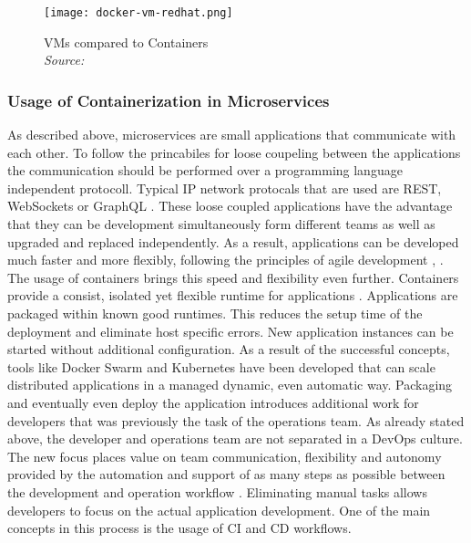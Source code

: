\documentclass[12pt, a4paper]{article}
\begin{document}
        \begin{figure}
            \centering
            \texttt{[image: docker-vm-redhat.png]}
            \caption{\ac{VM}s compared to Containers \\\textit{Source:~\cite{redhat_pic}}}\label{fig::vm_docker}
        \end{figure}

        \subsubsection{Usage of Containerization in Microservices}
        As described above, microservices are small applications that communicate with each other. To follow the princabiles for loose coupeling between the applications the communication should be performed over a programming language independent protocoll. Typical \acs{IP} network protocals that are used are \ac{REST}, WebSockets or GraphQL \cite{micro}. These loose coupled applications have the advantage that they can be development simultaneously form different teams as well as upgraded and replaced independently. As a result, applications can be developed much faster and more flexibly, following the principles of agile development \cite{micro}, \cite{redhat_micro}.\newline
        The usage of containers brings this speed and flexibility even further. Containers provide a consist, isolated yet flexible runtime for applications \cite{micro_container}. Applications are packaged within known good runtimes. This reduces the setup time of the deployment and eliminate host specific errors. New application instances can be started without additional configuration. As a result of the successful concepts, tools like Docker Swarm and Kubernetes have been developed that can scale distributed applications in a managed dynamic, even automatic way.\newline
        \noindent Packaging and eventually even deploy the application introduces additional work for developers that was previously the task of the operations team. As already stated above, the developer and operations team are not separated in a DevOps culture. The new focus places value on team communication, flexibility and autonomy provided by the automation and support of as many steps as possible between the development and operation workflow \cite{effective_devops}. Eliminating manual tasks allows developers to focus on the actual application development. One of the main concepts in this process is the usage of \ac{CI} and \ac{CD} workflows.
\end{document}
